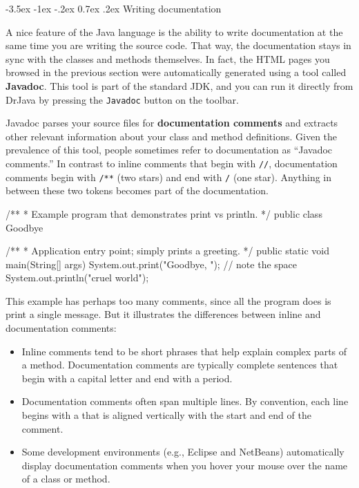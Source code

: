 \documentclass[12pt]{book}
\makeatletter
\renewcommand{\section}{\@startsection {section}{1}{\z@}%
    {-3.5ex \@plus -1ex \@minus -.2ex}%
    {0.7ex \@plus.2ex}%
    {\normalfont\Large\bfseries}}
\theoremstyle{exercise}
\makeatother
\begin{document}
\section{Writing documentation}


A nice feature of the Java language is the ability to write documentation at the same time you are writing the source code.
That way, the documentation stays in sync with the classes and methods themselves.
In fact, the HTML pages you browsed in the previous section were automatically generated using a tool called {\bf Javadoc}.
This tool is part of the standard JDK, and you can run it directly from DrJava by pressing the {\tt Javadoc} button on the toolbar.


Javadoc parses your source files for {\bf documentation comments} and extracts other relevant information about your class and method definitions.
Given the prevalence of this tool, people sometimes refer to documentation as ``Javadoc comments.''
In contrast to inline comments that begin with {\tt //}, documentation comments begin with {\tt /**} (two stars) and end with {\tt */} (one star).
Anything in between these two tokens becomes part of the documentation.

\begin{code}
/**
 * Example program that demonstrates print vs println.
 */
public class Goodbye {

    /**
     * Application entry point; simply prints a greeting.
     */
    public static void main(String[] args) {
        System.out.print("Goodbye, ");  // note the space
        System.out.println("cruel world");
    }

}
\end{code}

This example has perhaps too many comments, since all the program does is print a single message.
But it illustrates the differences between inline and documentation comments:

\begin{itemize}
\item Inline comments tend to be short phrases that help explain complex parts of a method.
Documentation comments are typically complete sentences that begin with a capital letter and end with a period.

\item Documentation comments often span multiple lines.
By convention, each line begins with a {\tt *} that is aligned vertically with the start and end of the comment.

\item Some development environments (e.g., Eclipse and NetBeans) automatically display documentation comments when you hover your mouse over the name of a class or method.

\end{itemize}
\end{document}
